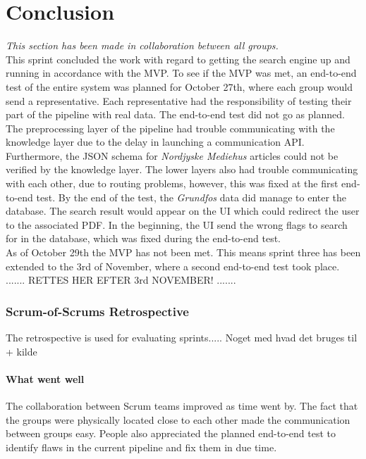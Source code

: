 \chapter{Conclusion}
\textit{This section has been made in collaboration between all groups.} \\

\noindent This sprint concluded the work with regard to getting the search engine up and running in accordance with the MVP. To see if the MVP was met, an end-to-end test of the entire system was planned for October 27th, where each group would send a representative. Each representative had the responsibility of testing their part of the pipeline with real data. The end-to-end test did not go as planned. The preprocessing layer of the pipeline had trouble communicating with the knowledge layer due to the delay in launching a communication API. Furthermore, the JSON schema for \textit{Nordjyske Mediehus} articles could not be verified by the knowledge layer.
The lower layers also had trouble communicating with each other, due to routing problems, however, this was fixed at the first end-to-end test. By the end of the test, the \textit{Grundfos} data did manage to enter the database. The search result would appear on the UI which could redirect the user to the associated PDF. In the beginning, the UI send the wrong flags to search for in the database, which was fixed during the end-to-end test.\\

\noindent As of October 29th the MVP has not been met. This means sprint three has been extended to the 3rd of November, where a second end-to-end test took place. \\
.......
RETTES HER EFTER 3rd NOVEMBER!
.......
\subsection{Scrum-of-Scrums Retrospective}
The retrospective is used for evaluating sprints.....
Noget med hvad det bruges til + kilde

\subsubsection{What went well}
The collaboration between Scrum teams improved as time went by. The fact that the groups were physically located close to each other made the communication between groups easy. People also appreciated the planned end-to-end test to identify flaws in the current pipeline and fix them in due time.

